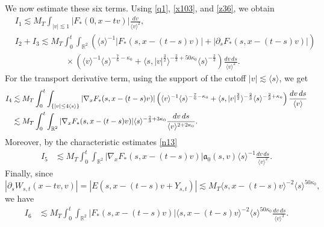 \documentclass[reqno,11pt]{amsart}
\numberwithin{equation}{section}
\begin{document}
	We now estimate these six terms. Using \eqref{q1}, \eqref{x103}, and \eqref{z36}, we obtain
	\begin{equation}\label{I123-bound}
	\begin{split}
	&I_1\lesssim M_T\int_{|v|\lesssim 1}|F_*(0,x-tv)|\frac{dv}{\langle v\rangle^2},\\
	&I_2+I_3\lesssim M_T\int_0^t\int_{\mathbb R^2}
		\left(\langle s\rangle^{-1}|F_*(s,x-(t-s)v)|+
		|\partial_sF_*(s,x-(t-s)v)|\right)\\
		&\qquad\qquad\qquad\times\left(
		\langle v\rangle^{-1}\langle s\rangle^{-\frac76-\kappa_0}+
		\langle s,|v|^{\frac32}\rangle^{-\frac23+50\kappa_0}
		\langle s\rangle^{-\frac23}\right)
		\frac{dv\,ds}{\langle v\rangle^2}.
	\end{split}
	\end{equation}
	For the transport derivative term, using the support of the cutoff
	$|v|\lesssim\langle s\rangle$, we get
	\begin{align}
	I_4&\lesssim M_T\int_0^t
		\int_{\{|v|\le 4\langle s\rangle\}}
		|\nabla_xF_*(s,x-(t-s)v)|\left(
		\langle v\rangle^{-1}\langle s\rangle^{-\frac76-\kappa_0}+
		\langle s,|v|^{\frac32}\rangle^{-\frac23}
		\langle s\rangle^{-\frac23+\kappa_0}
		\right)
		\frac{dv\,ds}{\langle v\rangle}
		\notag\\
		&\lesssim
		M_T\int_0^t\int_{\mathbb R^2}|\nabla_xF_*(s,x-(t-s)v)|
		\langle s\rangle^{-\frac23+3\kappa_0}
		\frac{dv\,ds}{\langle v\rangle^{2+2\kappa_0}}.
		\label{q20}
	\end{align}
	Moreover, by the characteristic estimates \eqref{n13}
	\begin{align}
		I_5&\lesssim M_T
		\int_0^t\int_{\mathbb R^2}
		|\nabla_xF_*(s,x-(t-s)v)|\mathfrak{a}_0(s,v)
		\langle s\rangle^{-1}
		\frac{dv\,ds}{\langle v\rangle^2}.
		\label{I5-bound}
	\end{align}
	Finally, since
	\begin{equation*}
		|\partial_sW_{s,t}(x-tv,v)|=|E(s,x-(t-s)v+Y_{s,t})|\lesssim M_T
		\langle s,x-(t-s)v\rangle^{-2}
		\langle s\rangle^{50\kappa_0},
	\end{equation*}
	we have
	\begin{align}
		I_6&\lesssim M_T
		\int_0^t\int_{\mathbb R^2}
		|F_*(s,x-(t-s)v)|\langle s,x-(t-s)v\rangle^{-2}
		\langle s\rangle^{50\kappa_0}
		\frac{dv\,ds}{\langle v\rangle^3}.
		\label{I6-bound}
	\end{align}
	
\end{document}
